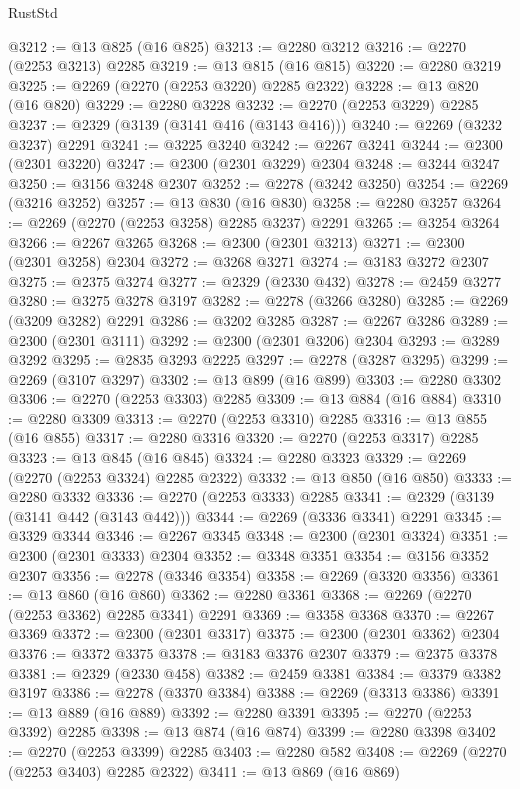 \begin{lexlean}{RustStd}
\begin{coremodule}
{\begin{coremodule}
{{{{{{{{{{{{@3212 := @13 @825 (@16 @825)
@3213 := @2280 @3212
@3216 := @2270 (@2253 @3213) @2285
@3219 := @13 @815 (@16 @815)
@3220 := @2280 @3219
@3225 := @2269 (@2270 (@2253 @3220) @2285 @2322)
@3228 := @13 @820 (@16 @820)
@3229 := @2280 @3228
@3232 := @2270 (@2253 @3229) @2285
@3237 := @2329 (@3139 (@3141 @416 (@3143 @416)))
@3240 := @2269 (@3232 @3237) @2291
@3241 := @3225 @3240
@3242 := @2267 @3241
@3244 := @2300 (@2301 @3220)
@3247 := @2300 (@2301 @3229) @2304
@3248 := @3244 @3247
@3250 := @3156 @3248 @2307
@3252 := @2278 (@3242 @3250)
@3254 := @2269 (@3216 @3252)
@3257 := @13 @830 (@16 @830)
@3258 := @2280 @3257
@3264 := @2269 (@2270 (@2253 @3258) @2285 @3237) @2291
@3265 := @3254 @3264
@3266 := @2267 @3265
@3268 := @2300 (@2301 @3213)
@3271 := @2300 (@2301 @3258) @2304
@3272 := @3268 @3271
@3274 := @3183 @3272 @2307
@3275 := @2375 @3274
@3277 := @2329 (@2330 @432)
@3278 := @2459 @3277
@3280 := @3275 @3278 @3197
@3282 := @2278 (@3266 @3280)
@3285 := @2269 (@3209 @3282) @2291
@3286 := @3202 @3285
@3287 := @2267 @3286
@3289 := @2300 (@2301 @3111)
@3292 := @2300 (@2301 @3206) @2304
@3293 := @3289 @3292
@3295 := @2835 @3293 @2225
@3297 := @2278 (@3287 @3295)
@3299 := @2269 (@3107 @3297)
@3302 := @13 @899 (@16 @899)
@3303 := @2280 @3302
@3306 := @2270 (@2253 @3303) @2285
@3309 := @13 @884 (@16 @884)
@3310 := @2280 @3309
@3313 := @2270 (@2253 @3310) @2285
@3316 := @13 @855 (@16 @855)
@3317 := @2280 @3316
@3320 := @2270 (@2253 @3317) @2285
@3323 := @13 @845 (@16 @845)
@3324 := @2280 @3323
@3329 := @2269 (@2270 (@2253 @3324) @2285 @2322)
@3332 := @13 @850 (@16 @850)
@3333 := @2280 @3332
@3336 := @2270 (@2253 @3333) @2285
@3341 := @2329 (@3139 (@3141 @442 (@3143 @442)))
@3344 := @2269 (@3336 @3341) @2291
@3345 := @3329 @3344
@3346 := @2267 @3345
@3348 := @2300 (@2301 @3324)
@3351 := @2300 (@2301 @3333) @2304
@3352 := @3348 @3351
@3354 := @3156 @3352 @2307
@3356 := @2278 (@3346 @3354)
@3358 := @2269 (@3320 @3356)
@3361 := @13 @860 (@16 @860)
@3362 := @2280 @3361
@3368 := @2269 (@2270 (@2253 @3362) @2285 @3341) @2291
@3369 := @3358 @3368
@3370 := @2267 @3369
@3372 := @2300 (@2301 @3317)
@3375 := @2300 (@2301 @3362) @2304
@3376 := @3372 @3375
@3378 := @3183 @3376 @2307
@3379 := @2375 @3378
@3381 := @2329 (@2330 @458)
@3382 := @2459 @3381
@3384 := @3379 @3382 @3197
@3386 := @2278 (@3370 @3384)
@3388 := @2269 (@3313 @3386)
@3391 := @13 @889 (@16 @889)
@3392 := @2280 @3391
@3395 := @2270 (@2253 @3392) @2285
@3398 := @13 @874 (@16 @874)
@3399 := @2280 @3398
@3402 := @2270 (@2253 @3399) @2285
@3403 := @2280 @582
@3408 := @2269 (@2270 (@2253 @3403) @2285 @2322)
@3411 := @13 @869 (@16 @869)
}}}}}}}}}}}}
\end{coremodule}}
\end{coremodule}
\end{lexlean}
